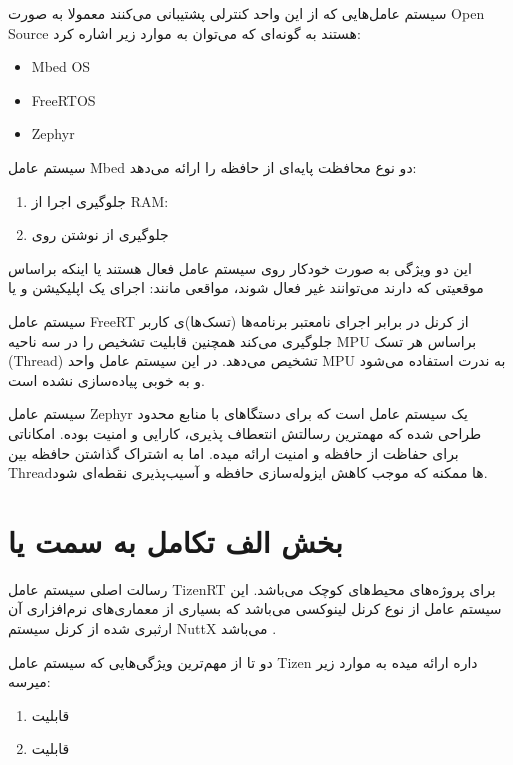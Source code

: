 \documentclass[10pt, a4paper]{article}
\begin{document}
سیستم عامل‌هایی که از این واحد کنترلی پشتیبانی می‌کنند معمولا به صورت Open
Source هستند به گونه‌ای‌ که می‌توان به موارد زیر اشاره کرد:

\begin{itemize}
    \item Mbed OS
    \item FreeRTOS
    \item Zephyr
\end{itemize}

سیستم عامل Mbed دو نوع محافظت پایه‌ای از حافظه را ارائه می‌دهد:

\begin{enumerate}
    \item جلوگیری اجرا از RAM: 
    \item جلوگیری از نوشتن روی 
\end{enumerate}

این دو ویژگی به صورت خودکار روی سیستم عامل فعال هستند یا اینکه براساس موقعیتی که
دارند می‌توانند غیر فعال شوند، مواقعی مانند: اجرای یک اپلیکیشن و یا 

سیستم عامل FreeRT از کرنل در برابر اجرای نامعتبر برنامه‌ها (تسک‌ها)ی کاربر
جلوگیری می‌کند همچنین قابلیت تشخیص  را در سه ناحیه MPU براساس
هر تسک (Thread) تشخیص می‌دهد. در این سیستم عامل واحد MPU به ندرت استفاده می‌شود
و به خوبی پیاده‌سازی نشده است.

سیستم عامل Zephyr یک سیستم عامل  است که برای دستگاهای با منابع
محدود طراحی شده که مهمترین رسالتش انتعطاف پذیری، کارایی و امنیت بوده. امکاناتی
برای حفاظت از حافظه و امنیت ارائه میده. اما به اشتراک گذاشتن حافظه بین Threadها
ممکنه که موجب کاهش ایزوله‌سازی حافظه و آسیب‌پذیری نقطه‌ای شود.

\section{بخش الف تکامل به سمت  یا }

رسالت اصلی سیستم عامل TizenRT برای پروژه‌های محیط‌های کوچک می‌باشد. این سیستم
عامل از نوع کرنل لینوکسی می‌باشد که بسیاری از معماری‌های نرم‌افزاری آن ارثبری
شده از کرنل سیستم NuttX می‌باشد \cite{nuttx}.

دو تا از مهم‌ترین ویژگی‌هایی که سیستم عامل Tizen داره ارائه میده به موارد زیر
میرسه:

\begin{enumerate}
    \item قابلیت 
    \item قابلیت 
\end{enumerate}
\end{document}
